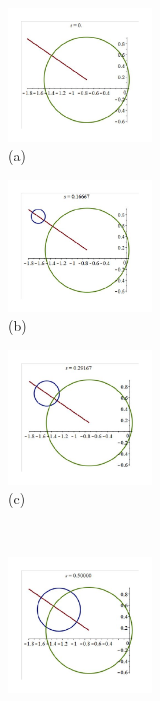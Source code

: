 \documentclass[12pt,a4paper]{article}%
\begin{document}
\begin{figure}
\begin{center}
\parbox[b]{1.5in}{\begin{center}
\includegraphics[width=1.5in,trim=0mm 0mm 0mm 15mm,clip,keepaspectratio]{PJH75H12.pdf}
\\
(a)
\end{center}}
\qquad
\parbox[b]{1.5in}{\begin{center}
\includegraphics[width=1.5in,trim=0mm 0mm 0mm 15mm,clip,keepaspectratio]{PJH75H13.pdf}
\\
(b)
\end{center}}
\qquad
\parbox[b]{1.5in}{\begin{center}
\includegraphics[width=1.5in,trim=0mm 0mm 0mm 15mm,clip,keepaspectratio]{PJH75H14.pdf}
\\
(c)
\end{center}}
\\
\parbox[b]{1.5in}{\begin{center}
\includegraphics[width=1.5in,trim=0mm 0mm 0mm 15mm,clip,keepaspectratio]{PJH75H15.pdf}

\end{center}}
\end{center}
\end{figure}
\end{document}

